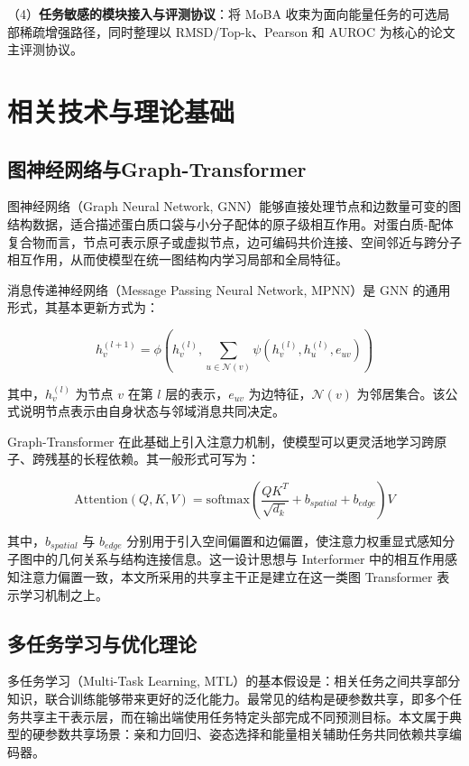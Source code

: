 （4）\textbf{任务敏感的模块接入与评测协议}：将 MoBA 收束为面向能量任务的可选局部稀疏增强路径，同时整理以 RMSD/Top-k、Pearson 和 AUROC 为核心的论文主评测协议。

\newpage

\section{相关技术与理论基础}
\subsection{图神经网络与Graph-Transformer}

图神经网络（Graph Neural Network, GNN）能够直接处理节点和边数量可变的图结构数据，适合描述蛋白质口袋与小分子配体的原子级相互作用\cite{gilmer2017neural}。对蛋白质-配体复合物而言，节点可表示原子或虚拟节点，边可编码共价连接、空间邻近与跨分子相互作用，从而使模型在统一图结构内学习局部和全局特征。

消息传递神经网络（Message Passing Neural Network, MPNN）是 GNN 的通用形式，其基本更新方式为：

\begin{equation}
 h_v^{(l+1)} = \phi\left(h_v^{(l)}, \sum_{u \in \mathcal{N}(v)} \psi\left(h_v^{(l)}, h_u^{(l)}, e_{uv}\right)\right)
\end{equation}

其中，$h_v^{(l)}$ 为节点 $v$ 在第 $l$ 层的表示，$e_{uv}$ 为边特征，$\mathcal{N}(v)$ 为邻居集合。该公式说明节点表示由自身状态与邻域消息共同决定。

Graph-Transformer 在此基础上引入注意力机制，使模型可以更灵活地学习跨原子、跨残基的长程依赖。其一般形式可写为：

\begin{equation}
 \text{Attention}(Q, K, V) = \text{softmax}\left(\frac{QK^T}{\sqrt{d_k}} + b_{spatial} + b_{edge}\right)V
\end{equation}

其中，$b_{spatial}$ 与 $b_{edge}$ 分别用于引入空间偏置和边偏置，使注意力权重显式感知分子图中的几何关系与结构连接信息。这一设计思想与 Interformer\cite{lai2024interformer} 中的相互作用感知注意力偏置一致，本文所采用的共享主干正是建立在这一类图 Transformer 表示学习机制之上。

\subsection{多任务学习与优化理论}

多任务学习（Multi-Task Learning, MTL）的基本假设是：相关任务之间共享部分知识，联合训练能够带来更好的泛化能力\cite{caruana1997multitask}。最常见的结构是硬参数共享，即多个任务共享主干表示层，而在输出端使用任务特定头部完成不同预测目标\cite{ruder2017overview,zhang2021survey}。本文属于典型的硬参数共享场景：亲和力回归、姿态选择和能量相关辅助任务共同依赖共享编码器。


